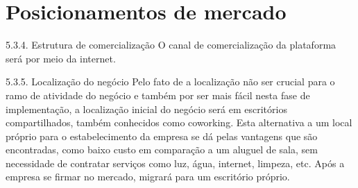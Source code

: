 \section{\textbf{Posicionamentos de mercado}}
\label{sec: Posicionamentos de mercado}


\begin{commentA}

\par \end{commentA}

5.3.4. Estrutura de comercialização 
O canal de comercialização da plataforma será por meio da internet.  

5.3.5. Localização do negócio 
Pelo fato de a localização não ser crucial para o ramo de atividade do negócio e também por ser mais fácil nesta fase de implementação, a localização inicial do negócio será em escritórios compartilhados, também conhecidos como coworking. 
Esta alternativa a um local próprio para o estabelecimento da empresa se dá pelas vantagens que são encontradas, como baixo custo em comparação a um aluguel de sala, sem necessidade de contratar serviços como luz, água, internet, limpeza, etc. Após a empresa se firmar no mercado, migrará para um escritório próprio. 

